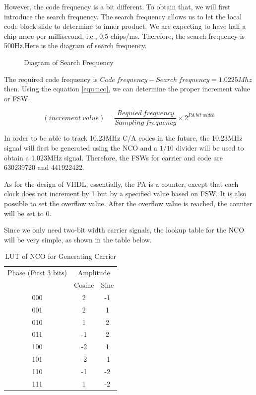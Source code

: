 However, the code frequency is a bit different. To obtain that, we will first introduce the search frequency. The search frequency allows us to let the local code block slide to determine to inner product. We are expecting to have half a chip more per millisecond, i.e., 0.5 chips/ms. Therefore, the search frequency is 500Hz.Here is the diagram of search frequency.

\begin{figure}[!htbp]
    \centering
    
    \caption{Diagram of Search Frequency}
    \label{fig:search_frequency}
\end{figure}

The required code frequency is $Code\  frequency-Search\ frequency = 1.0225Mhz$ then. Using the equation \ref{equ:nco}, we can determine the proper increment value or FSW.

\begin{equation}
    (increment\ value) = \frac{Requied\ frequency}{Sampling\ frequency} \times 2^{PA\ bit\ width}
\end{equation}

In order to be able to track 10.23MHz C/A codes in the future, the 10.23MHz signal will first be generated using the NCO and a $1/10$ divider will be used to obtain a 1.023MHz signal. Therefore, the FSWs for carrier and code are \num{630239720} and \num{441922422}.

As for the design of VHDL, essentially, the PA is a counter, except that each clock does not increment by 1 but by a specified value based on FSW. It is also possible to set the overflow value. After the overflow value is reached, the counter will be set to 0.

Since we only need two-bit width carrier signals, the lookup table for the NCO will be very simple, as shown in the table below.

\begin{table}[!htbp]
\centering
\renewcommand\arraystretch{1.5}
\caption{LUT of NCO for Generating Carrier}
\label{tab:lut_nco}
\begin{tabular}{ccc}
    \toprule
    Phase (First 3 bits) & \multicolumn{2}{c}{Amplitude} \\
    & Cosine & Sine \\
    \midrule
    000 & 2 & -1 \\
    001 & 2 & 1 \\
    010 & 1 & 2 \\
    011 & -1 & 2 \\
    100 & -2 & 1 \\
    101 & -2 & -1 \\
    110 & -1 & -2 \\
    111 & 1 & -2 \\
    \bottomrule
\end{tabular}
\end{table}

